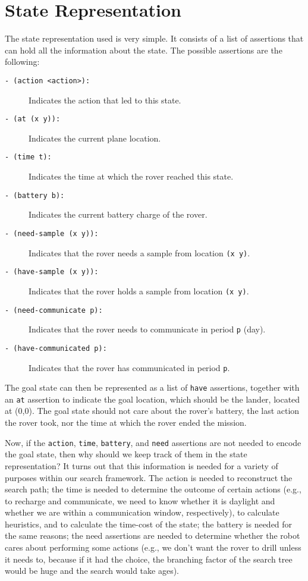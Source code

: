 \section{State Representation}

The state representation used is very simple. It consists of a list of assertions that can hold all the
information about the state. The possible assertions are the following:

\begin{description}
	\item[\texttt{- (action <action>):}] Indicates the action that led to this state.
	\item[\texttt{- (at (x y)):}] Indicates the current plane location.
	\item[\texttt{- (time t):}] Indicates the time at which the rover reached this state.
	\item[\texttt{- (battery b):}] Indicates the current battery charge of the rover.
	\item[\texttt{- (need-sample (x y)):}] Indicates that the rover needs a sample from location \texttt{(x y)}.
	\item[\texttt{- (have-sample (x y)):}] Indicates that the rover holds a sample from location \texttt{(x y)}.
	\item[\texttt{- (need-communicate p):}] Indicates that the rover needs to communicate in period \texttt{p} (day).
	\item[\texttt{- (have-communicated p):}] Indicates that the rover has communicated in period \texttt{p}.
\end{description}

The goal state can then be represented as a list of \texttt{have} assertions, together with an \texttt{at}
assertion to indicate the goal location, which should be the lander, located at (0,0). The goal state should
not care about the rover's battery, the last action the rover took, nor the time at which the rover ended
the mission.

Now, if the \texttt{action}, \texttt{time}, \texttt{battery}, and \texttt{need} assertions are not needed to
encode the goal state, then why should we keep track of them in the state representation? It turns out that
this information is needed for a variety of purposes within our search framework. The action is needed to
reconstruct the search path; the time is needed to determine the outcome of certain actions (e.g., to recharge and
communicate, we need to know whether it is daylight and whether we are within a communication window,
respectively), to calculate heuristics, and to calculate the time-cost of the state; the battery is needed for
the same reasons; the need assertions are needed to determine whether the robot cares about performing some
actions (e.g., we don't want the rover to drill unless it needs to, because if it had the choice, the branching
factor of the search tree would be huge and the search would take ages).

